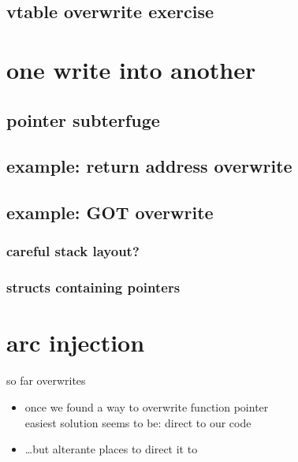 \subsection{vtable overwrite exercise}


\section{one write into another}

\subsection{pointer subterfuge}


\subsection{example: return address overwrite}


\subsection{example: GOT overwrite}


\subsubsection{careful stack layout?}


\subsubsection{structs containing pointers}


\section{arc injection}
\begin{frame}{so far overwrites}
    \begin{itemize}
    \item once we found a way to overwrite function pointer\\
          easiest solution seems to be: direct to our code
    \item \ldots but alterante places to direct it to
    \end{itemize}
\end{frame}

